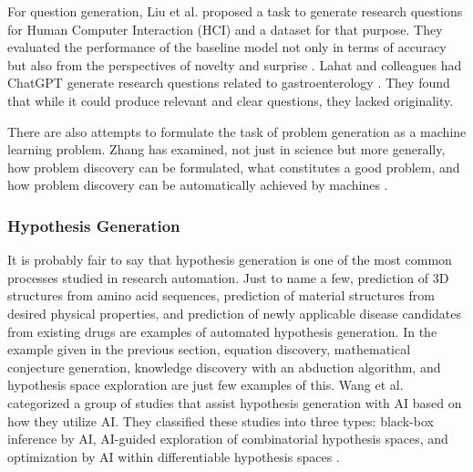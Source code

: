 For question generation, Liu et al. proposed a task to generate research questions for Human Computer Interaction (HCI) and a dataset for that purpose. They evaluated the performance of the baseline model not only in terms of accuracy but also from the perspectives of novelty and surprise \cite{liu2023creative}. Lahat and colleagues had ChatGPT generate research questions related to gastroenterology \cite{lahat2023evaluating}. They found that while it could produce relevant and clear questions, they lacked originality.

There are also attempts to formulate the task of problem generation as a machine learning problem. Zhang has examined, not just in science but more generally, how problem discovery can be formulated, what constitutes a good problem, and how problem discovery can be automatically achieved by machines \cite{zhang2021problem}. %







\subsubsection{Hypothesis Generation}
It is probably fair to say that hypothesis generation is one of the most common processes studied in research automation. Just to name a few, prediction of 3D structures from amino acid sequences, prediction of material structures from desired physical properties, and prediction of newly applicable disease candidates from existing drugs are examples of automated hypothesis generation. In the example given in the previous section, equation discovery, mathematical conjecture generation, knowledge discovery with an abduction algorithm, and hypothesis space exploration are just few examples of this. Wang et al. categorized a group of studies that assist hypothesis generation with AI based on how they utilize AI. They classified these studies into three types: black-box inference by AI, AI-guided exploration of combinatorial hypothesis spaces, and optimization by AI within differentiable hypothesis spaces \cite{wang2023scientific}. 

